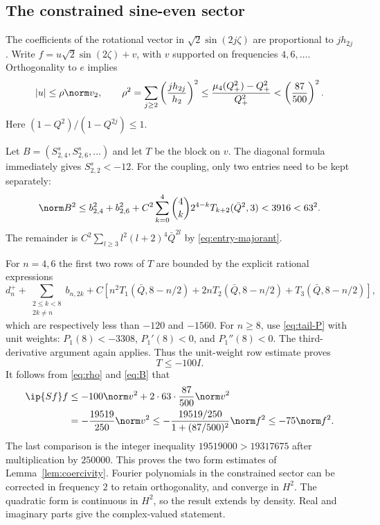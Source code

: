 \subsection{The constrained sine-even sector}
The coefficients of the rotational vector in $\sqrt2\sin(2j\zeta)$ are proportional to $j h_{2j}$. Write $f=u\sqrt2\sin(2\zeta)+v$, with $v$ supported on frequencies $4,6,\ldots$. Orthogonality to $e$ implies
\begin{equation}\label{eq:rho}
 |u|\le\rho\norm v_2,\qquad
 \rho^2=\sum_{j\ge2}\left(\frac{j h_{2j}}{h_2}\right)^2
 \le\frac{\mu_4(Q_+^2)-Q_+^2}{Q_+^2}<\left(\frac{87}{500}\right)^2.
\end{equation}
Here $(1-Q^2)/(1-Q^{2j})\le1$.

Let $B=(S^s_{2,4},S^s_{2,6},\ldots)$ and let $T$ be the block on $v$. The diagonal formula immediately gives $S^s_{2,2}<-12$. For the coupling, only two entries need to be kept separately:
\begin{equation}\label{eq:B}
 \norm B^2\le b_{2,4}^2+b_{2,6}^2+
 C^2\sum_{k=0}^4\binom4k 2^{4-k}T_{k+2}(\bar Q^2,3)
 <3916<63^2.
\end{equation}
The remainder is $C^2\sum_{l\ge3}l^2(l+2)^4\bar Q^{2l}$ by \eqref{eq:entry-majorant}.

For $n=4,6$ the first two rows of $T$ are bounded by the explicit rational expressions
\begin{equation}\label{eq:T-low}
 d_n^++\sum_{\substack{2\le k<8\\2k\ne n}}b_{n,2k}
 +C\left[n^2T_1(\bar Q,8-n/2)+2nT_2(\bar Q,8-n/2)
 +T_3(\bar Q,8-n/2)\right],
\end{equation}
which are respectively less than $-120$ and $-1560$. For $n\ge8$, use \eqref{eq:tail-P} with unit weights: $P_1(8)<-3308$, $P_1'(8)<0$, and $P_1''(8)<0$. The third-derivative argument again applies. Thus the unit-weight row estimate proves
\[
 T\le-100I.
\]
It follows from \eqref{eq:rho} and \eqref{eq:B} that
\begin{align*}
 \ip{Sf}f
 &\le-100\norm v^2+2\cdot63\cdot\frac{87}{500}\norm v^2\\
 &=-\frac{19519}{250}\norm v^2
 \le-\frac{19519/250}{1+(87/500)^2}\norm f^2
 \le-75\norm f^2.
\end{align*}
The last comparison is the integer inequality $19519000>19317675$ after multiplication by $250000$. This proves the two form estimates of Lemma~\ref{lem:coercivity}. Fourier polynomials in the constrained sector can be corrected in frequency $2$ to retain orthogonality, and converge in $H^2$. The quadratic form is continuous in $H^2$, so the result extends by density. Real and imaginary parts give the complex-valued statement.


